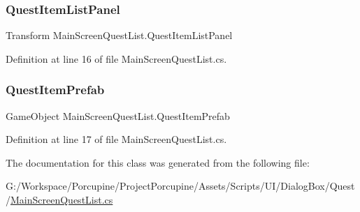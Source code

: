 \subsubsection{\texorpdfstring{Quest\+Item\+List\+Panel}{QuestItemListPanel}}
{\footnotesize\ttfamily Transform Main\+Screen\+Quest\+List.\+Quest\+Item\+List\+Panel}



Definition at line 16 of file Main\+Screen\+Quest\+List.\+cs.

\mbox{\label{class_main_screen_quest_list_ae1064238395f280fd4293ec57df7fbc8}} 
\subsubsection{\texorpdfstring{Quest\+Item\+Prefab}{QuestItemPrefab}}
{\footnotesize\ttfamily Game\+Object Main\+Screen\+Quest\+List.\+Quest\+Item\+Prefab}



Definition at line 17 of file Main\+Screen\+Quest\+List.\+cs.



The documentation for this class was generated from the following file\+:\begin{DoxyCompactItemize}
\item 
G\+:/\+Workspace/\+Porcupine/\+Project\+Porcupine/\+Assets/\+Scripts/\+U\+I/\+Dialog\+Box/\+Quest/\hyperlink{_main_screen_quest_list_8cs}{Main\+Screen\+Quest\+List.\+cs}\end{DoxyCompactItemize}
